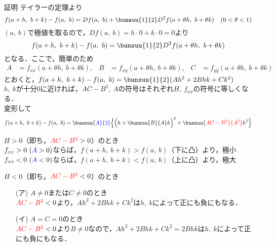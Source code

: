 \begin{tip}{証明}
	テイラーの定理より
	\begin{equation*}
		f(a + h,\ b + k) - f(a,\ b) = Df(a,\ b) + \bunsuu{1}{2}D^2 f(a + \theta h,\ b + \theta k) \quad (0 < \theta < 1)
	\end{equation*}
	$(a,\ b)$で極値を取るので，$Df(a,\ b) = h \cdot 0 + k \cdot 0 = 0$より
	\begin{equation*}
		f(a + h,\ b + k) - f(a,\ b) = \bunsuu{1}{2}D^2 f(a + \theta h,\ b + \theta k)
	\end{equation*}
	となる．ここで，簡単のため
	\begin{align*}
		A &= f_{xx}(a + \theta h,\ b + \theta k), &
		B &= f_{xy}(a + \theta h,\ b + \theta k), &
		C &= f_{yy}(a + \theta h,\ b + \theta k)
	\end{align*}
	とおくと，$f(a + h,\ b + k) - f(a,\ b) = \bunsuu{1}{2}(Ah^2 + 2Bhk + Ck^2)$\\
	$h,\ k$が十分$0$に近ければ，$AC - B^2,\ A$の符号はそれぞれ$H,\ f_{xx}$の符号に等しくなる．\\
	変形して
	\begin{equation*}
		f(a + h,\ b + k) - f(a,\ b) = \bunsuu{\color{blue}A}{2}\Bigl\{\Bigl(h + \bunsuu{B}{A}k\Bigr)^2 + \bunsuu{\color{red}AC - B^2}{A^2}k^2\Bigr\}
	\end{equation*}
	\begin{enumerate}[label=\textbf{[\arabic*]}, labelsep=10pt, leftmargin=23pt]
		\item $H > 0$（即ち，${\color{red}AC - B^2} > 0$）のとき\\
			$f_{xx} > 0\ ({\color{blue}A} > 0)$ならば，$f(a + h,\ b + k) > f(a,\ b)$（下に凸）より，極小\\
			$f_{xx} < 0\ ({\color{blue}A} < 0)$ならば，$f(a + h,\ b + k) < f(a,\ b)$（上に凸）より，極大
		\item $H < 0$（即ち，${\color{red}AC - B^2} < 0$）のとき
			\begin{enumerate}[labelsep=10pt, leftmargin=23pt]
				\item[(ア)] $A \ne 0$または$C \ne 0$のとき\\
					${\color{red}AC - B^2} < 0$より，$Ah^2 + 2Bhk + Ck^2$は$h,\ k$によって正にも負にもなる．
				\item[(イ)] $A = C = 0$のとき\\
					${\color{red}AC - B^2} < 0$より$B \ne 0$なので，$Ah^2 + 2Bhk + Ck^2 = 2Bhk$は$h,\ k$によって正にも負にもなる．
			\end{enumerate}
	\end{enumerate}
\end{tip}



